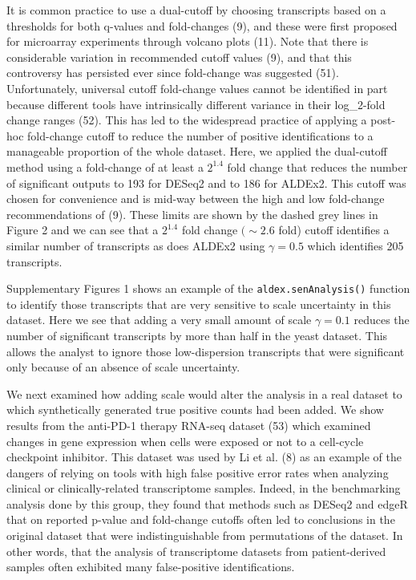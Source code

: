 \documentclass[
]{article}
\providecommand{\DIFadd}[1]{{\protect\color{blue}\uwave{#1}}} %
\providecommand{\DIFaddbegin}{} %
\providecommand{\DIFaddend}{} %
\newcommand{\DIFaddincludegraphics}[2][]{{\color{blue}\fbox{\DIFOincludegraphics[#1]{#2}}}} %
\DeclareRobustCommand{\DIFaddbegin}{\DIFOaddbegin \let\includegraphics\DIFaddincludegraphics} %
\DeclareRobustCommand{\DIFaddend}{\DIFOaddend \let\includegraphics\DIFOincludegraphics} %
\begin{document}
It is common practice to use a dual-cutoff by choosing transcripts based
on a thresholds for both q-values and fold-changes (9), and these were
first proposed for microarray experiments through volcano plots (11).
Note that there is considerable variation in recommended cutoff values
(9), and that this controversy has persisted ever since fold-change was
suggested (51). Unfortunately, universal cutoff fold-change values
cannot be identified in part because different tools have intrinsically
different variance in their log\_2-fold change ranges (52). This has led
to the widespread practice of applying a post-hoc fold-change cutoff to
reduce the number of positive identifications to a manageable proportion
of the whole dataset. Here, we applied the dual-cutoff method using a
fold-change of at least a \(2^{1.4}\) fold change that reduces the
number of significant outputs to 193 for DESeq2 and to 186 for ALDEx2.
This cutoff was chosen for convenience and is mid-way between the high
and low fold-change recommendations of (9). These limits are shown by
the dashed grey lines in Figure 2 and we can see that a \(2^{1.4}\) fold
change \((\sim 2.6\) fold) cutoff identifies a similar number of
transcripts as does ALDEx2 using \(\gamma = 0.5\) which identifies 205
transcripts.

Supplementary Figures 1 shows an example of the
\texttt{aldex.senAnalysis()} function to identify those transcripts that
are very sensitive to scale uncertainty in this dataset. Here we see
that adding a very small amount of scale \(\gamma = 0.1\) reduces the
number of significant transcripts by more than half in the yeast
dataset. This allows the analyst to ignore those low-dispersion
transcripts that were significant only because of an absence of scale
uncertainty.

We next examined how adding scale would alter the analysis in a real
dataset to which synthetically generated true positive counts had been
added. We show results from the anti-PD-1 therapy RNA-seq dataset (53)
which examined changes in gene expression when cells were exposed or not
to a cell-cycle checkpoint inhibitor. This dataset was used by Li et al.
(8) as an example of the dangers of relying on tools with high false
positive error rates when analyzing clinical or clinically-related
transcriptome samples. Indeed, in the benchmarking analysis done by this
group, they found that  \DIFaddbegin \DIFadd{parameter-based }\DIFaddend methods such as DESeq2 and edgeR
that \DIFaddbegin \DIFadd{rely }\DIFaddend on reported p-value and fold-change cutoffs often led to
conclusions in the original dataset that were indistinguishable from
permutations of the dataset. In other words, that the analysis of
transcriptome datasets from patient-derived samples often exhibited many
false-positive identifications.
\end{document}
